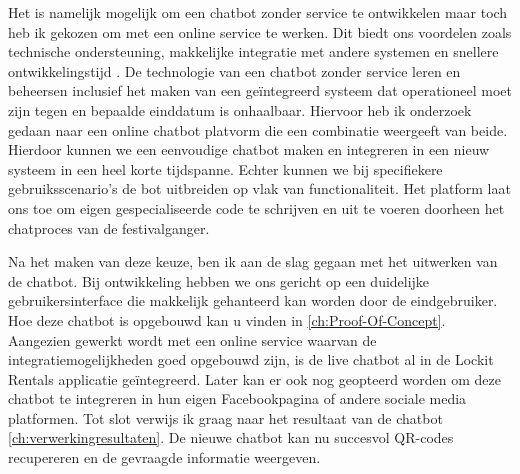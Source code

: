 Het is namelijk mogelijk om een chatbot zonder service te ontwikkelen maar toch heb ik gekozen om met een online service te werken. Dit biedt ons voordelen zoals technische ondersteuning, makkelijke integratie met andere systemen en snellere ontwikkelingstijd \autocite{Mercir2022} \autocite{folstad2021investigating}. De technologie van een chatbot zonder service leren en beheersen inclusief het maken van een geïntegreerd systeem dat operationeel moet zijn tegen en bepaalde einddatum is onhaalbaar. Hiervoor heb ik onderzoek gedaan naar een online chatbot platvorm die een combinatie weergeeft van beide. Hierdoor kunnen we een eenvoudige chatbot maken en integreren in een nieuw systeem in een heel korte tijdspanne. Echter kunnen we bij specifiekere gebruiksscenario’s de bot uitbreiden op vlak van functionaliteit. Het platform laat ons toe om eigen gespecialiseerde code te schrijven en uit te voeren doorheen het chatproces van de festivalganger. 


Na het maken van deze keuze, ben ik aan de slag gegaan met het uitwerken van de chatbot. Bij ontwikkeling hebben we ons gericht op een duidelijke gebruikersinterface die makkelijk gehanteerd kan worden door de eindgebruiker. Hoe deze chatbot is opgebouwd kan u vinden in \ref{ch:Proof-Of-Concept}. Aangezien gewerkt wordt met een online service waarvan de integratiemogelijkheden goed opgebouwd zijn, is de live chatbot al in de Lockit Rentals applicatie geïntegreerd. Later kan er ook nog geopteerd worden om deze chatbot te integreren in hun eigen Facebookpagina of andere sociale media platformen. 
Tot slot verwijs ik graag naar het resultaat van de chatbot \ref{ch:verwerkingresultaten}. De nieuwe chatbot kan nu succesvol QR-codes recupereren en de gevraagde informatie weergeven.





